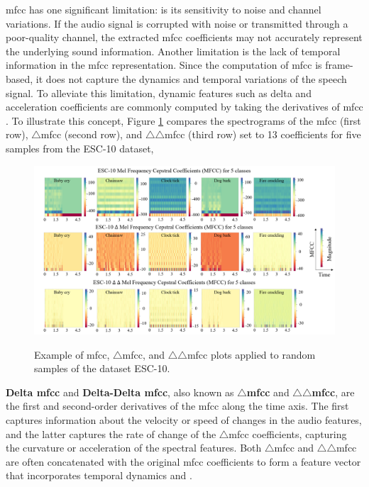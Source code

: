 \gls{mfcc} has one significant limitation: is its sensitivity to noise and channel variations. If the audio signal is corrupted with noise or transmitted through a poor-quality channel, the extracted \gls{mfcc} coefficients may not accurately represent the underlying sound information. Another limitation is the lack of temporal information in the \gls{mfcc} representation. Since the computation of \gls{mfcc} is frame-based, it does not capture the dynamics and temporal variations of the speech signal. To alleviate this limitation, dynamic features such as delta and acceleration coefficients are commonly computed by taking the derivatives of \gls{mfcc} \cite{Gold2011}. To illustrate this concept, Figure \ref{fig:frmwk_spectral_features_mfcc} compares the spectrograms of the \gls{mfcc} (first row), $\triangle$\gls{mfcc} (second row), and $\triangle\triangle$\gls{mfcc} (third row) set to 13 coefficients for five samples from the ESC-10 dataset, 

\begin{figure}[htbp]
    \raggedright
        \caption{Example of \gls{mfcc}, $\triangle$\gls{mfcc}, and $\triangle\triangle$\gls{mfcc} plots applied to random samples of the dataset ESC-10.}
        \includegraphics[width=1.0\textwidth]{resources/images/030-theoretical_framework/Framework_spectral_features_mfcc.png}
        \label{fig:frmwk_spectral_features_mfcc}
\end{figure}

\textbf{Delta \gls{mfcc}} and \textbf{Delta-Delta \gls{mfcc}}, also known as \textbf{$\triangle$\gls{mfcc}} and \textbf{$\triangle\triangle$\gls{mfcc}}, are the first and second-order derivatives of the \gls{mfcc} along the time axis. The first captures information about the velocity or speed of changes in the audio features, and the latter captures the rate of change of the $\triangle$\gls{mfcc} coefficients, capturing the curvature or acceleration of the spectral features. Both $\triangle$\gls{mfcc} and $\triangle\triangle$\gls{mfcc} are often concatenated with the original \gls{mfcc} coefficients to form a feature vector that incorporates temporal dynamics \cite{Bountourakis2019} and \cite{Tang2018}. 


